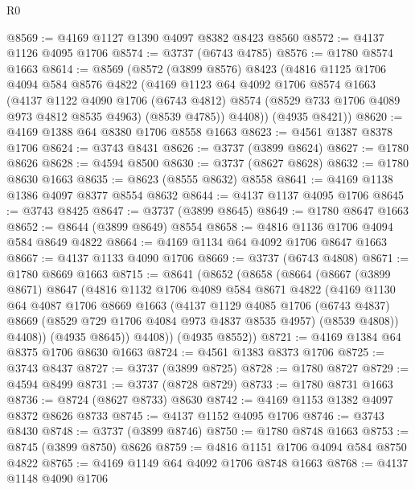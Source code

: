 \begin{lexlean}{R0}
\begin{coremodule}
@8569 := @4169 @1127 @1390 @4097 @8382 @8423 @8560
@8572 := @4137 @1126 @4095 @1706
@8574 := @3737 (@6743 @4785)
@8576 := @1780 @8574 @1663
@8614 := @8569
    (@8572
      (@3899 @8576)
      @8423
      (@4816
        @1125
        @1706
        @4094
        @584
        @8576
        @4822
        (@4169
          @1123
          @64
          @4092
          @1706
          @8574
          @1663
          (@4137
            @1122
            @4090
            @1706
            (@6743 @4812)
            @8574
            (@8529 @733 @1706 @4089 @973 @4812 @8535 @4963)
            (@8539 @4785))
          @4408))
      (@4935 @8421))
@8620 := @4169 @1388 @64 @8380 @1706 @8558 @1663
@8623 := @4561 @1387 @8378 @1706
@8624 := @3743 @8431
@8626 := @3737 (@3899 @8624)
@8627 := @1780 @8626
@8628 := @4594 @8500
@8630 := @3737 (@8627 @8628)
@8632 := @1780 @8630 @1663
@8635 := @8623 (@8555 @8632) @8558
@8641 := @4169 @1138 @1386 @4097 @8377 @8554 @8632
@8644 := @4137 @1137 @4095 @1706
@8645 := @3743 @8425
@8647 := @3737 (@3899 @8645)
@8649 := @1780 @8647 @1663
@8652 := @8644 (@3899 @8649) @8554
@8658 := @4816 @1136 @1706 @4094 @584 @8649 @4822
@8664 := @4169 @1134 @64 @4092 @1706 @8647 @1663
@8667 := @4137 @1133 @4090 @1706
@8669 := @3737 (@6743 @4808)
@8671 := @1780 @8669 @1663
@8715 := @8641
    (@8652
      (@8658
        (@8664
          (@8667
            (@3899 @8671)
            @8647
            (@4816
              @1132
              @1706
              @4089
              @584
              @8671
              @4822
              (@4169
                @1130
                @64
                @4087
                @1706
                @8669
                @1663
                (@4137
                  @1129
                  @4085
                  @1706
                  (@6743 @4837)
                  @8669
                  (@8529 @729 @1706 @4084 @973 @4837 @8535 @4957)
                  (@8539 @4808))
                @4408))
            (@4935 @8645))
          @4408))
      (@4935 @8552))
@8721 := @4169 @1384 @64 @8375 @1706 @8630 @1663
@8724 := @4561 @1383 @8373 @1706
@8725 := @3743 @8437
@8727 := @3737 (@3899 @8725)
@8728 := @1780 @8727
@8729 := @4594 @8499
@8731 := @3737 (@8728 @8729)
@8733 := @1780 @8731 @1663
@8736 := @8724 (@8627 @8733) @8630
@8742 := @4169 @1153 @1382 @4097 @8372 @8626 @8733
@8745 := @4137 @1152 @4095 @1706
@8746 := @3743 @8430
@8748 := @3737 (@3899 @8746)
@8750 := @1780 @8748 @1663
@8753 := @8745 (@3899 @8750) @8626
@8759 := @4816 @1151 @1706 @4094 @584 @8750 @4822
@8765 := @4169 @1149 @64 @4092 @1706 @8748 @1663
@8768 := @4137 @1148 @4090 @1706

\end{coremodule}
\end{lexlean}

